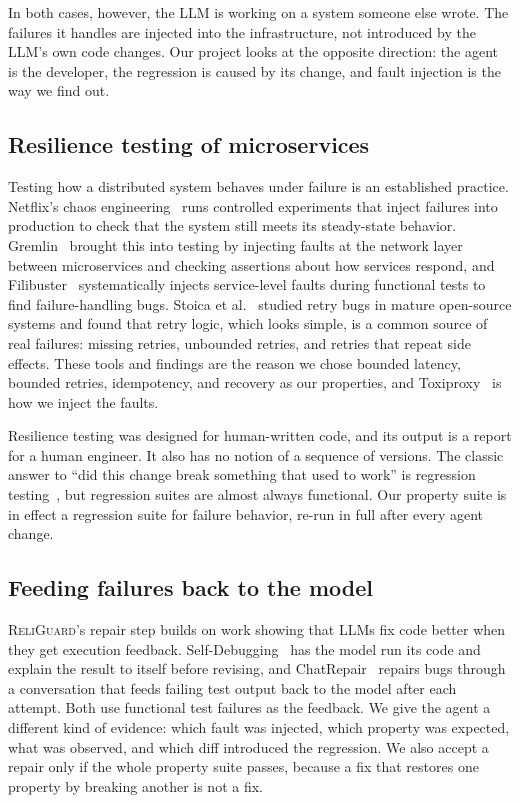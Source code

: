 \documentclass[sigconf,review]{acmart}
\begin{document}
In both cases, however, the LLM is working on a system someone else wrote. The failures it handles
are injected into the infrastructure, not introduced by the LLM's own code changes. Our project
looks at the opposite direction: the agent is the developer, the regression is caused by its
change, and fault injection is the way we find out.

\subsection{Resilience testing of microservices}

Testing how a distributed system behaves under failure is an established practice. Netflix's chaos
engineering~\cite{basiri2016chaos} runs controlled experiments that inject failures into production
to check that the system still meets its steady-state behavior. Gremlin~\cite{heorhiadi2016gremlin}
brought this into testing by injecting faults at the network layer between microservices and
checking assertions about how services respond, and Filibuster~\cite{meiklejohn2021filibuster}
systematically injects service-level faults during functional tests to find failure-handling bugs.
Stoica et al.~\cite{stoica2024retry} studied retry bugs in mature open-source systems and found that
retry logic, which looks simple, is a common source of real failures: missing retries, unbounded
retries, and retries that repeat side effects. These tools and findings are the reason we chose
bounded latency, bounded retries, idempotency, and recovery as our properties, and
Toxiproxy~\cite{toxiproxy} is how we inject the faults.

Resilience testing was designed for human-written code, and its output is a report for a human
engineer. It also has no notion of a sequence of versions. The classic answer to ``did this change
break something that used to work'' is regression testing~\cite{yoo2012regression}, but regression
suites are almost always functional. Our property suite is in effect a regression suite for failure
behavior, re-run in full after every agent change.

\subsection{Feeding failures back to the model}

\textsc{ReliGuard}'s repair step builds on work showing that LLMs fix code better when they get
execution feedback. Self-Debugging~\cite{chen2024selfdebug} has the model run its code and explain
the result to itself before revising, and ChatRepair~\cite{xia2024chatrepair} repairs bugs through
a conversation that feeds failing test output back to the model after each attempt. Both use
functional test failures as the feedback. We give the agent a different kind of evidence: which
fault was injected, which property was expected, what was observed, and which diff introduced the
regression. We also accept a repair only if the whole property suite passes, because a fix that
restores one property by breaking another is not a fix.
\end{document}
